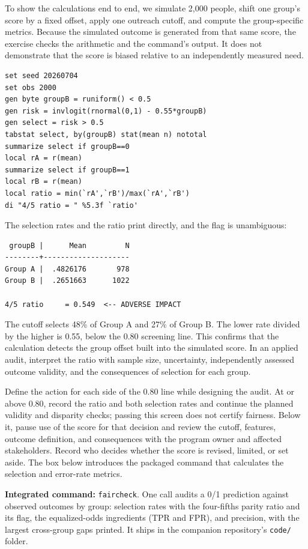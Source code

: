 To show the calculations end to end, we simulate 2{,}000 people, shift one group's score by a fixed offset, apply one outreach cutoff, and compute the group-specific metrics. Because the simulated outcome is generated from that same score, the exercise checks the arithmetic and the command's output. It does not demonstrate that the score is biased relative to an independently measured need.
\par
{\footnotesize
\begin{verbatim}
set seed 20260704
set obs 2000
gen byte groupB = runiform() < 0.5
gen risk = invlogit(rnormal(0,1) - 0.55*groupB)
gen select = risk > 0.5
tabstat select, by(groupB) stat(mean n) nototal
summarize select if groupB==0
local rA = r(mean)
summarize select if groupB==1
local rB = r(mean)
local ratio = min(`rA',`rB')/max(`rA',`rB')
di "4/5 ratio = " %5.3f `ratio'
\end{verbatim}
}
The selection rates and the ratio print directly, and the flag is unambiguous:
\par
{\footnotesize
\begin{verbatim}
 groupB |      Mean         N
--------+--------------------
Group A |  .4826176       978
Group B |  .2651663      1022

4/5 ratio     = 0.549  <-- ADVERSE IMPACT
\end{verbatim}
}
The cutoff selects 48\% of Group A and 27\% of Group B. The lower rate divided by the higher is 0.55, below the 0.80 screening line. This confirms that the calculation detects the group offset built into the simulated score. In an applied audit, interpret the ratio with sample size, uncertainty, independently assessed outcome validity, and the consequences of selection for each group.

Define the action for each side of the 0.80 line while designing the audit. At or above 0.80, record the ratio and both selection rates and continue the planned validity and disparity checks; passing this screen does not certify fairness. Below it, pause use of the score for that decision and review the cutoff, features, outcome definition, and consequences with the program owner and affected stakeholders. Record who decides whether the score is revised, limited, or set aside. The box below introduces the packaged command that calculates the selection and error-rate metrics.

\begin{kaobox}[frametitle=Package Integration: \texttt{faircheck}]
\textbf{Integrated command:} \texttt{faircheck}. One call audits a 0/1 prediction against observed outcomes by group: selection rates with the four-fifths parity ratio and its flag, the equalized-odds ingredients (TPR and FPR), and precision, with the largest cross-group gaps printed. It ships in the companion repository's \texttt{code/} folder.
\end{kaobox}

